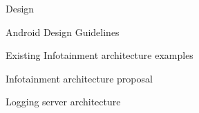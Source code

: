\chap Design

\sec Android Design Guidelines

\sec Existing Infotainment architecture examples

\sec Infotainment architecture proposal

\sec Logging server architecture


